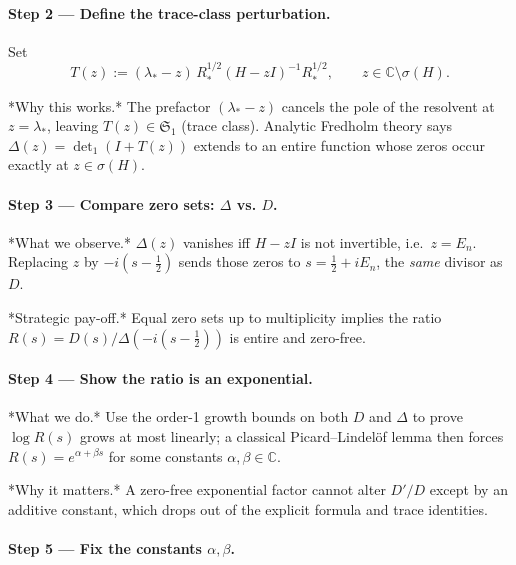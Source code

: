 \documentclass[11pt]{article}
\begin{document}
\paragraph{Step 2 — Define the trace-class perturbation.}

Set  
\[
   T(z)
   :=(\lambda_*-z)\,R_*^{1/2}(H-zI)^{-1}R_*^{1/2},
   \qquad z\in\mathbb C\setminus\sigma(H).
\]

*Why this works.*  
The prefactor $(\lambda_*-z)$ cancels the pole of the resolvent at
$z=\lambda_*$, leaving $T(z)\in\mathfrak S_1$ (trace class).  
Analytic Fredholm theory says
$\Delta(z)=\det_{1}(I+T(z))$ extends to an entire function whose zeros
occur exactly at $z\in\sigma(H)$.

\vspace{0.4em}
\paragraph{Step 3 — Compare zero sets: $\Delta$ vs. $D$.}

*What we observe.*  
$\Delta(z)$ vanishes iff $H-zI$ is not invertible,
i.e.\ $z=E_n$.  
Replacing $z$ by $-i(s-\tfrac12)$ sends those zeros to
$s=\tfrac12+iE_n$, the \emph{same} divisor as $D$.

*Strategic pay-off.*  
Equal zero sets up to multiplicity implies the ratio  
\(R(s)=D(s)\big/\Delta(-i(s-\tfrac12))\)  
is entire and zero-free.

\vspace{0.4em}
\paragraph{Step 4 — Show the ratio is an exponential.}

*What we do.*  
Use the order-1 growth bounds on both $D$ and $\Delta$ to prove  
$\log R(s)$ grows at most linearly; a classical Picard–Lindelöf
lemma then forces  
\(R(s)=e^{\alpha+\beta s}\)  
for some constants $\alpha,\beta\in\mathbb C$.

*Why it matters.*  
A zero-free exponential factor cannot alter $D'/D$ except by an
additive constant, which drops out of the explicit formula and trace
identities.

\vspace{0.4em}
\paragraph{Step 5 — Fix the constants $\alpha,\beta$.}
\end{document}
